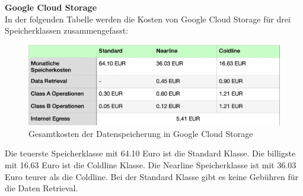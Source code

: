 \textbf{Google Cloud Storage}\\

In der folgenden Tabelle werden die Kosten von Google Cloud Storage für drei Speicherklassen zusammengefasst:

\begin{figure}[h]
\centering
	\includegraphics[width=12cm,keepaspectratio]{Pictures/GCKostenOhneGesamt.png}
	\caption{Gesamtkosten der Datenspeicherung in Google Cloud Storage}
\end{figure}

Die teuerste Speicherklasse mit 64.10 Euro ist die Standard Klasse. Die billigste mit 16.63 Euro ist die Coldline Klasse. Die Nearline Speicherklasse ist mit 36.03 Euro teurer als die Coldline. Bei der Standard Klasse gibt es keine Gebühren für die Daten Retrieval.
